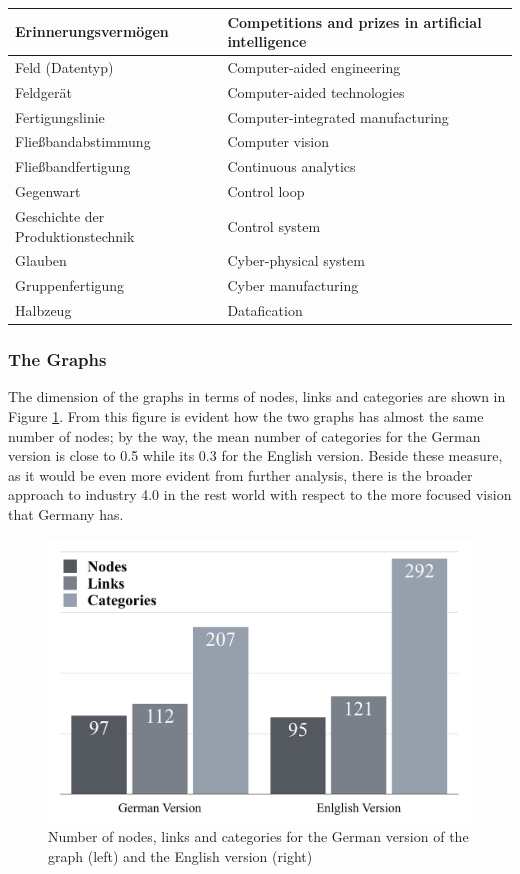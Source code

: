 \documentclass[]{book}
\begin{document}
\begin{tabular}{l|l}
\hline
Erinnerungsvermögen & Competitions and prizes in artificial intelligence\\
\hline
Feld (Datentyp) & Computer-aided engineering\\
\hline
Feldgerät & Computer-aided technologies\\
\hline
Fertigungslinie & Computer-integrated manufacturing\\
\hline
Fließbandabstimmung & Computer vision\\
\hline
Fließbandfertigung & Continuous analytics\\
\hline
Gegenwart & Control loop\\
\hline
Geschichte der Produktionstechnik & Control system\\
\hline
Glauben & Cyber-physical system\\
\hline
Gruppenfertigung & Cyber manufacturing\\
\hline
Halbzeug & Datafication\\
\hline
\end{tabular}

\subsubsection*{The Graphs}\label{the-graphs}

The dimension of the graphs in terms of nodes, links and categories are
shown in Figure \ref{fig:graphmetricsindustrie}. From this figure is
evident how the two graphs has almost the same number of nodes; by the
way, the mean number of categories for the German version is close to
0.5 while its 0.3 for the English version. Beside these measure, as it
would be even more evident from further analysis, there is the broader
approach to industry 4.0 in the rest world with respect to the more
focused vision that Germany has.

\begin{figure}

{\centering \includegraphics[width=0.8\linewidth]{_bookdown_files/figures/graph_metrics_industrie} 

}

\caption{Number of nodes, links and categories for the German version of the graph (left) and the English version (right)}\label{fig:graphmetricsindustrie}
\end{figure}
\end{document}

